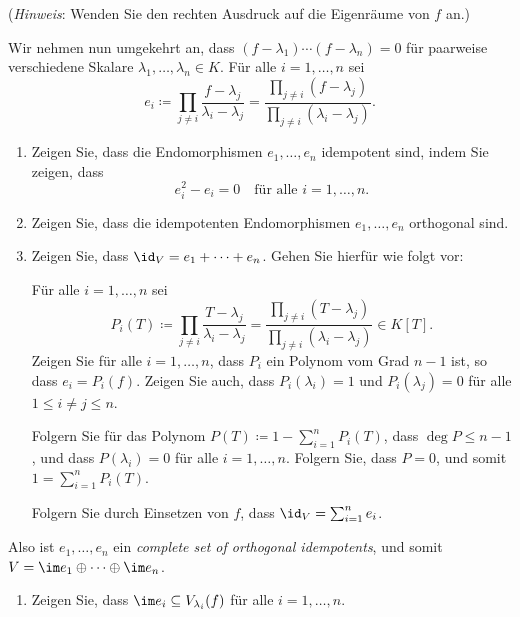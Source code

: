 \begin{question}
\begin{enumerate}[resume]
      (\emph{Hinweis}:
       Wenden Sie den rechten Ausdruck auf die Eigenräume von $f$ an.)
  \end{enumerate}
  Wir nehmen nun umgekehrt an, dass $(f - \lambda_1) \dotsm (f - \lambda_n) = 0$ für paarweise verschiedene Skalare $\lambda_1, \dotsc, \lambda_n \in K$.
  Für alle $i = 1, \dotsc, n$ sei
  \[
              e_i
    \coloneqq \prod_{j \neq i} \frac{f - \lambda_j}{\lambda_i - \lambda_j}
    =         \frac{\prod_{j \neq i} (f-\lambda_j)}{\prod_{j \neq i} (\lambda_i - \lambda_j)}.
  \]
  \begin{enumerate}[resume]
    \item
      Zeigen Sie, dass die Endomorphismen $e_1, \dotsc, e_n$ idempotent sind, indem Sie zeigen, dass
      \[
        e_i^2 - e_i = 0
        \quad
        \text{für alle $i = 1, \dotsc, n$}.
      \]
    \item
      Zeigen Sie, dass die idempotenten Endomorphismen $e_1, \dotsc, e_n$ orthogonal sind.
    \item
      Zeigen Sie, dass $\id_V = e_1 + \dotsb + e_n$.
      Gehen Sie hierfür wie folgt vor:
      
      Für alle $i = 1, \dotsc, n$ sei
      \[
                  P_i(T)
        \coloneqq \prod_{j \neq i} \frac{T - \lambda_j}{\lambda_i - \lambda_j}
        =         \frac{\prod_{j \neq i} (T-\lambda_j)}{\prod_{j \neq i} (\lambda_i - \lambda_j)}
        \in K[T].
      \]
      Zeigen Sie für alle $i = 1, \dotsc, n$, dass $P_i$ ein Polynom vom Grad $n-1$ ist, so dass $e_i = P_i(f)$.
      Zeigen Sie auch, dass $P_i(\lambda_i) = 1$ und $P_i(\lambda_j) = 0$ für alle $1 \leq i \neq j \leq n$.
      
      Folgern Sie für das Polynom $P(T) \coloneqq 1 - \sum_{i=1}^n P_i(T)$, dass $\deg P \leq n-1$, und dass $P(\lambda_i) = 0$ für alle $i = 1, \dotsc, n$.
      Folgern Sie, dass $P = 0$, und somit $1 = \sum_{i=1}^n P_i(T)$.
      
      Folgern Sie durch Einsetzen von $f$, dass $\id_V = \sum_{i=1}^n e_i$.
  \end{enumerate}
  Also ist $e_1, \dotsc, e_n$ ein \emph{complete set of orthogonal idempotents}, und somit $V = \im e_1 \oplus \dotsb \oplus \im e_n$.
  \begin{enumerate}[resume]
    \item
      Zeigen Sie, dass $\im e_i \subseteq V_{\lambda_i}(f)$ für alle $i = 1, \dotsc, n$.
      

\end{enumerate}
\end{question}
